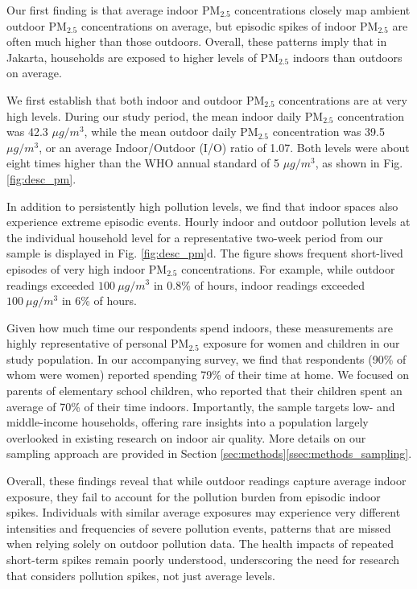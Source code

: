 \documentclass[9pt,twocolumn,twoside]{pnas-new}
\begin{document}
Our first finding is that average indoor PM$_{2.5}$ concentrations closely map ambient outdoor PM$_{2.5}$ concentrations on average, but episodic spikes of indoor PM$_{2.5}$ are often much higher than those outdoors. Overall, these patterns imply that in Jakarta, households are exposed to higher levels of PM$_{2.5}$ indoors than outdoors on average.

We first establish that both indoor and outdoor PM$_{2.5}$ concentrations are at very high levels. During our study period, the mean indoor daily PM$_{2.5}$ concentration was 42.3 $\mu g/m^3$, while the mean outdoor daily PM$_{2.5}$ concentration was 39.5 $\mu g/m^3$, or an average Indoor/Outdoor (I/O) ratio of 1.07. Both levels were about eight times higher than the WHO annual standard of 5 $\mu g/m^3$, as shown in Fig. \ref{fig:desc_pm}.

In addition to persistently high pollution levels, we find that indoor spaces also experience extreme episodic events. Hourly indoor and outdoor pollution levels at the individual household level for a representative two-week period from our sample is displayed in Fig. \ref{fig:desc_pm}d. 
The figure shows frequent short-lived episodes of very high indoor PM$_{2.5}$ concentrations. For example, while outdoor readings exceeded $100~\mu g/m^3$ in 0.8\% of hours, indoor readings exceeded $100~\mu g/m^3$ in 6\% of hours. 

Given how much time our respondents spend indoors, these measurements are highly representative of personal PM$_{2.5}$ exposure for women and children in our study population. In our accompanying survey, we find that respondents (90\% of whom were women) reported spending 79\% of their time at home. We focused on parents of elementary school children, who reported that their children spent an average of 70\% of their time indoors. Importantly, the sample targets low- and middle-income households, offering rare insights into a population largely overlooked in existing research on indoor air quality. More details on our sampling approach are provided in Section \ref{sec:methods}\ref{ssec:methods_sampling}.

Overall, these findings reveal that while outdoor readings capture average indoor exposure, they fail to account for the pollution burden from episodic indoor spikes. Individuals with similar average exposures may experience very different intensities and frequencies of severe pollution events, patterns that are missed when relying solely on outdoor pollution data. The health impacts of repeated short-term spikes remain poorly understood, underscoring the need for research that considers pollution spikes, not just average levels.
\end{document}
